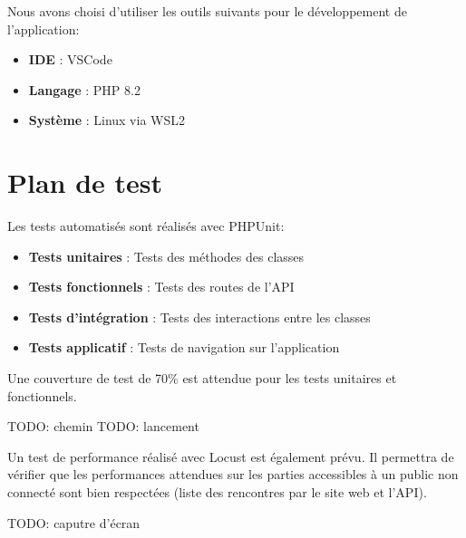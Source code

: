 \documentclass{book}
\begin{document}
Nous avons choisi d'utiliser les outils suivants pour le développement de l'application:
\begin{itemize}
    \item \textbf{IDE} : VSCode
    \item \textbf{Langage} : PHP 8.2
    \item \textbf{Système} : Linux via WSL2
\end{itemize}

\chapter{Plan de test}

Les tests automatisés sont réalisés avec PHPUnit:

\begin{itemize}
    \item \textbf{Tests unitaires} : Tests des méthodes des classes
    \item \textbf{Tests fonctionnels} : Tests des routes de l'API
    \item \textbf{Tests d'intégration} : Tests des interactions entre les classes
    \item \textbf{Tests applicatif} : Tests de navigation sur l'application
\end{itemize}

Une couverture de test de 70\% est attendue pour les tests unitaires et fonctionnels.

TODO: chemin
TODO: lancement

Un test de performance réalisé avec Locust est également prévu. Il permettra de vérifier que les performances attendues sur les parties accessibles
à un public non connecté sont bien respectées (liste des rencontres par le site web et l'API).

TODO: caputre d'écran

\begin{appendix}
    \listoffigures
    \listoftables
  \end{appendix}
\end{document}

